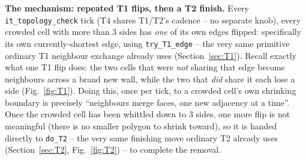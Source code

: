 \documentclass[11pt,a4paper]{report}
\begin{document}
\textbf{The mechanism: repeated T1 flips, then a T2 finish.} Every
\texttt{it\_topology\_check} tick (T4 shares T1/T2's cadence -- no
separate knob), every crowded cell with more than 3 sides has
\emph{one} of its own edges flipped: specifically its own
currently-shortest edge, using \texttt{try\_T1\_edge} -- the very same
primitive ordinary T1 neighbour exchange already uses
(Section~\ref{sec:T1}). Recall exactly what one T1 flip does: the two
cells that were \emph{not} sharing that edge become neighbours across
a brand new wall, while the two that \emph{did} share it each lose a
side (Fig.~\ref{fig:T1}). Doing this, once per tick, to a crowded
cell's own shrinking boundary is precisely ``neighbours merge faces,
one new adjacency at a time''. Once the crowded cell has been whittled
down to 3 sides, one more flip is not meaningful (there is no smaller
polygon to shrink toward), so it is handed directly to
\texttt{do\_T2} -- the very same finishing move ordinary T2 already
uses (Section~\ref{sec:T2}, Fig.~\ref{fig:T2}) -- to complete the
removal.
\end{document}
